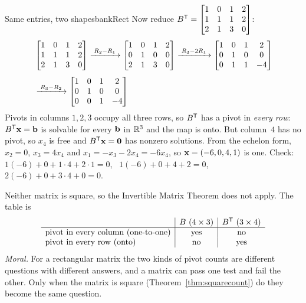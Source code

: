 \documentclass[11pt]{article}
\begin{document}
\begin{exmp}{Same entries, two shapes}{bankRect}
Now reduce $B^{\mathsf T}=\begin{bmatrix}1&0&1&2\\1&1&1&2\\2&1&3&0\end{bmatrix}$:
\begin{align*}
&\begin{bmatrix}1&0&1&2\\1&1&1&2\\2&1&3&0\end{bmatrix}
\xrightarrow{\;R_2-R_1\;}
\begin{bmatrix}1&0&1&2\\0&1&0&0\\2&1&3&0\end{bmatrix}
\xrightarrow{\;R_3-2R_1\;}
\begin{bmatrix}1&0&1&2\\0&1&0&0\\0&1&1&-4\end{bmatrix}\\[4pt]
&\xrightarrow{\;R_3-R_2\;}
\begin{bmatrix}1&0&1&2\\0&1&0&0\\0&0&1&-4\end{bmatrix}
\end{align*}
Pivots in columns $1,2,3$ occupy all three rows, so $B^{\mathsf T}$ has a pivot in \emph{every row}: $B^{\mathsf T}\mathbf{x}=\mathbf{b}$ is solvable for every $\mathbf{b}$ in $\mathbb{R}^3$ and the map is onto. But column~$4$ has no pivot, so $x_4$ is free and $B^{\mathsf T}\mathbf{x}=\mathbf{0}$ has nonzero solutions. From the echelon form, $x_2=0$, $x_3=4x_4$ and $x_1=-x_3-2x_4=-6x_4$, so $\mathbf{x}=(-6,0,4,1)$ is one. Check: $1(-6)+0+1\cdot4+2\cdot1=0$, \ $1(-6)+0+4+2=0$, \ $2(-6)+0+3\cdot4+0=0$.

Neither matrix is square, so the Invertible Matrix Theorem does not apply. The table is
\[
\begin{array}{l|c|c}
 & B\ (4\times3) & B^{\mathsf T}\ (3\times4)\\\hline
\text{pivot in every column (one-to-one)} & \text{yes} & \text{no}\\
\text{pivot in every row (onto)} & \text{no} & \text{yes}
\end{array}
\]
\emph{Moral.} For a rectangular matrix the two kinds of pivot counts are different questions with different answers, and a matrix can pass one test and fail the other. Only when the matrix is square (Theorem~\ref{thm:squarecount}) do they become the same question.
\end{exmp}
\end{document}
